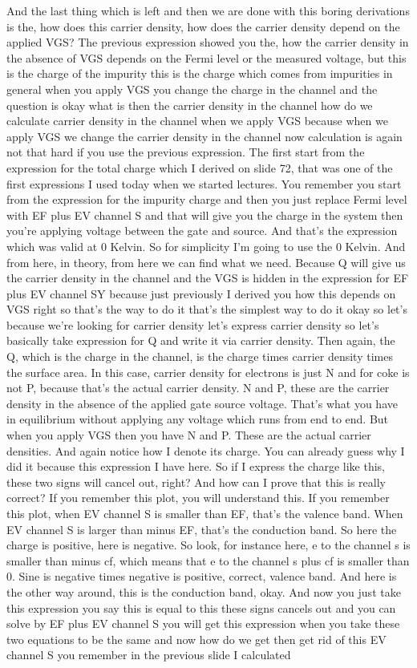 And the last thing which is left and then we are done with this boring derivations is the, how does this carrier density, how does the carrier density depend on the applied VGS? The previous expression showed you the, how the carrier density in the absence of VGS depends on the Fermi level or the measured voltage, but this is the charge of the impurity this is the charge which comes from impurities in general when you apply VGS you change the charge in the channel and the question is okay what is then the carrier density in the channel how do we calculate carrier density in the channel when we apply VGS because when we apply VGS we change the carrier density in the channel now calculation is again not that hard if you use the previous expression. The first start from the expression for the total charge which I derived on slide 72, that was one of the first expressions I used today when we started lectures. You remember you start from the expression for the impurity charge and then you just replace Fermi level with EF plus EV channel S and that will give you the charge in the system then you're applying voltage between the gate and source. And that's the expression which was valid at 0 Kelvin. So for simplicity I'm going to use the 0 Kelvin. And from here, in theory, from here we can find what we need. Because Q will give us the carrier density in the channel and the VGS is hidden in the expression for EF plus EV channel SY because just previously I derived you how this depends on VGS right so that's the way to do it that's the simplest way to do it okay so let's because we're looking for carrier density let's express carrier density so let's basically take expression for Q and write it via carrier density. Then again, the Q, which is the charge in the channel, is the charge times carrier density times the surface area. In this case, carrier density for electrons is just N and for coke is not P, because that's the actual carrier density. N and P, these are the carrier density in the absence of the applied gate source voltage. That's what you have in equilibrium without applying any voltage which runs from end to end. But when you apply VGS then you have N and P. These are the actual carrier densities. And again notice how I denote its charge. You can already guess why I did it because this expression I have here. So if I express the charge like this, these two signs will cancel out, right? And how can I prove that this is really correct? If you remember this plot, you will understand this. If you remember this plot, when EV channel S is smaller than EF, that's the valence band. When EV channel S is larger than minus EF, that's the conduction band. So here the charge is positive, here is negative. So look, for instance here, e to the channel s is smaller than minus cf, which means that e to the channel s plus cf is smaller than 0. Sine is negative times negative is positive, correct, valence band. And here is the other way around, this is the conduction band, okay. And now you just take this expression you say this is equal to this these signs cancels out and you can solve by EF plus EV channel S you will get this expression when you take these two equations to be the same and now how do we get then get rid of this EV channel S you remember in the previous slide I calculated 